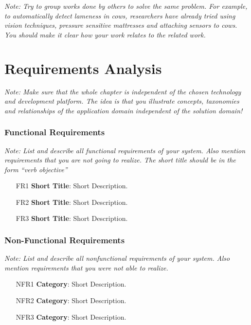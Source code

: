 \documentclass[a4paper,12pt,twoside]{report}
\begin{document}
\textit{Note: Try to group works done by others to solve the same problem. For example, to automatically detect lameness in cows, researchers have already tried using vision techniques, pressure sensitive mattresses and attaching sensors to cows. You should make it clear how your work relates to the related work.}


\chapter{Requirements Analysis}

\textit{Note: Make sure that the whole chapter is independent of the chosen technology and development platform. The idea is that you illustrate concepts, taxonomies and relationships of the application domain independent of the solution domain!}

\subsection{Functional Requirements}

\textit{Note: List and describe all functional requirements of your system. Also mention requirements that you are not going to realize. The short title should be in the form ``verb objective''}

\begin{itemize}
\item [FR1] \textbf{Short Title}: Short Description.
\item [FR2] \textbf{Short Title}: Short Description.
\item [FR3] \textbf{Short Title}: Short Description.
\end{itemize}

\subsection{Non-Functional Requirements}

\textit{Note: List and describe all nonfunctional requirements of your system. Also mention requirements that you were not able to realize.}

\begin{itemize}
\item [NFR1] \textbf{Category}: Short Description.
\item [NFR2] \textbf{Category}: Short Description.
\item [NFR3] \textbf{Category}: Short Description.
\end{itemize}
\end{document}

